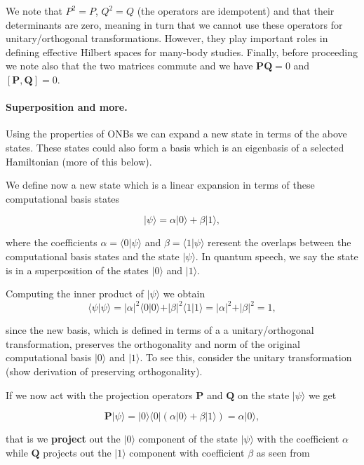 We note that $P^2=P$, $Q^2=Q$ (the operators are idempotent) and that
their determinants are zero, meaning in turn that we cannot use these
operators for unitary/orthogonal transformations. However, they play
important roles in defining effective Hilbert spaces for many-body
studies. Finally, before proceeding we note also that the two matrices
commute and we have $\bm{P}\bm{Q}=0$ and $\left[ \bm{P},\bm{Q}\right]=0$.

\paragraph{Superposition and more.}
Using the properties of ONBs we can expand a new state in terms of the
above states. These states could also form  a basis which is an
eigenbasis of a selected Hamiltonian (more of this below).

We define now a new state which is a linear expansion in terms of
these computational basis states

\[
\vert \psi \rangle = \alpha \vert 0 \rangle + \beta\vert 1 \rangle,
\]

where the coefficients $\alpha = \langle 0 \vert \psi \rangle$ and
$\beta =\langle 1 \vert \psi\rangle$ reresent the overlaps between the
computational basis states and the state $\vert \psi\rangle$. In quantum speech, we say the state is in a superposition of the states $\vert 0\rangle$ and $\vert 1\rangle$.

Computing the inner product of $\vert \psi \rangle$ we obtain
\[
\langle \psi \vert \psi \rangle = \vert \alpha \vert ^2\langle 0\vert 0\rangle + \vert \beta \vert ^2\langle 1\vert 1\rangle = \vert \alpha \vert ^2 + \vert \beta \vert ^2 = 1,
\]

since the new basis, which is defined in terms of a a unitary/orthogonal
transformation, preserves the orthogonality and norm of the original
computational basis $\vert 0\rangle$ and $\vert 1\rangle$. To see
this, consider the unitary transformation (show derivation of
preserving orthogonality).

If we now act with the projection operators $\bm{P}$ and $\bm{Q}$ on
the state $\vert \psi\rangle$ we get

\[
\bm{P}\vert \psi \rangle = \vert 0 \rangle\langle 0\vert (\alpha \vert 0 \rangle + \beta\vert 1 \rangle)=\alpha \vert 0\rangle,
\]

that is we \textbf{project} out the $\vert 0\rangle$ component of the state
$\vert \psi\rangle$ with the coefficient $\alpha$ while $\bm{Q}$
projects out the $\vert 1\rangle$ component with coefficient $\beta$
as seen from

